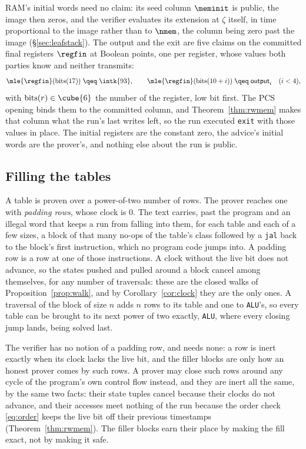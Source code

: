 RAM's initial words need no claim: its seed column $\meminit$ is public, the image then zeros, and the verifier evaluates its extension at $\zeta$ itself, in time proportional to the image rather than to $\nmem$, the column being zero past the image (\S\ref{sec:leafstack}). The output and the exit are five claims on the committed final registers $\regfin$ at Boolean points, one per register, whose values both parties know and neither transmits:
\[
  \mle{\regfin}(\mathrm{bits}(17))\;\qeq\;\intk{93},\qquad \mle{\regfin}(\mathrm{bits}(10+i))\;\qeq\;\textsf{output}_i\quad(i<4),
\]
with $\mathrm{bits}(r)\in\cube{6}$ the number of the register, low bit first. The PCS opening binds them to the committed column, and Theorem~\ref{thm:rwmem} makes that column what the run's last writes left, so the run executed \texttt{exit} with those values in place. The initial registers are the constant zero, the advice's initial words are the prover's, and nothing else about the run is public.

\subsection{Filling the tables}\label{sec:e2e-pad}

A table is proven over a power-of-two number of rows. The prover reaches one with \emph{padding rows}, whose clock is $0$. The text carries, past the program and an illegal word that keeps a run from falling into them, for each table and each of a few sizes, a block of that many no-ops of the table's class followed by a \texttt{jal} back to the block's first instruction, which no program code jumps into. A padding row is a row at one of those instructions. A clock without the live bit does not advance, so the states pushed and pulled around a block cancel among themselves, for any number of traversals: these are the closed walks of Proposition~\ref{prop:walk}, and by Corollary~\ref{cor:clock} they are the only ones. A traversal of the block of size $n$ adds $n$ rows to its table and one to \texttt{ALU}'s, so every table can be brought to its next power of two exactly, \texttt{ALU}, where every closing jump lands, being solved last.

The verifier has no notion of a padding row, and needs none: a row is inert exactly when its clock lacks the live bit, and the filler blocks are only how an honest prover comes by such rows. A prover may close such rows around any cycle of the program's own control flow instead, and they are inert all the same, by the same two facts: their state tuples cancel because their clocks do not advance, and their accesses meet nothing of the run because the order check \eqref{eq:order} keeps the live bit off their previous timestamps (Theorem~\ref{thm:rwmem}). The filler blocks earn their place by making the fill exact, not by making it safe.

